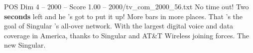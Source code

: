 \begin{textsample}{POS Dim 4 – 2000 – Score 1.00 – 2000/tv\_com\_2000\_56.txt}  \label{ex:f4_pos_075}
No time out!
Two \textbf{seconds} left and he 's got to put it up!
More bars in more places.
That 's the goal of Singular 's all-over network.
With the largest digital voice and data coverage in America, thanks to Singular and AT\&T Wireless joining forces.
The new Singular.

\end{textsample}
